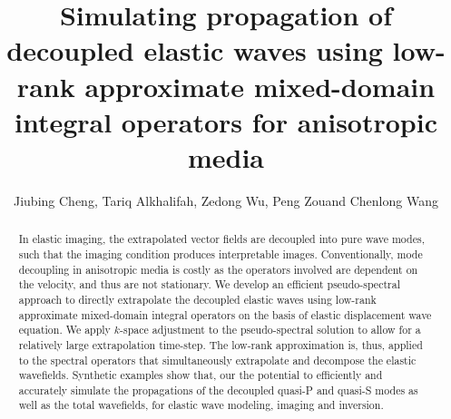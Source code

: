 \title{Simulating propagation of decoupled elastic waves using low-rank approximate mixed-domain integral operators for anisotropic media}

\author{
Jiubing Cheng\footnotemark[1], Tariq Alkhalifah\footnotemark[2], Zedong Wu\footnotemark[3], Peng Zou\footnotemark[4] and Chenlong Wang\footnotemark[5]
}

\address{
\footnotemark[1] Tongji University, State Key Laboratory of Marine Geology, Shanghai, China. E-mail: cjb1206@tongji.edu.cn \\
\footnotemark[2] King Abdullah University of Science and Technology, Thuwal, Saudi Arabia. E-mail: tariq.alkhalifah@kaust.edu.sa \\
\footnotemark[3] King Abdullah University of Science and Technology, Thuwal, Saudi Arabia. E-mail: zedong.wu@kaust.edu.sa \\
\footnotemark[4] Tongji University, Shanghai, China. E-mail: 1533006@tongji.edu.cn \\
\footnotemark[5] Tongji University, Shanghai, China. E-mail: skoltyz.10000@163.com 
}


\maketitle

\begin{abstract}
	In elastic imaging, the extrapolated vector fields are decoupled
	into pure wave modes, such that the imaging condition produces interpretable
	images.
	Conventionally, mode decoupling in anisotropic media is costly as
	the operators involved are dependent on the velocity, and thus are not stationary.
	We develop an efficient pseudo-spectral approach to directly extrapolate
	the decoupled elastic waves using low-rank approximate
	mixed-domain integral operators on the basis of  elastic displacement wave equation.
	We apply $k$-space adjustment to the pseudo-spectral solution to allow for
	a relatively large extrapolation time-step. 
	The low-rank approximation is, thus, applied to the spectral operators that
	simultaneously extrapolate and decompose the elastic wavefields.
    Synthetic examples 
	show that, our  the potential to efficiently and
	accurately simulate the propagations of the decoupled quasi-P and quasi-S
	modes as well as the total wavefields, for elastic wave modeling, imaging
	and inversion.
\end{abstract}

